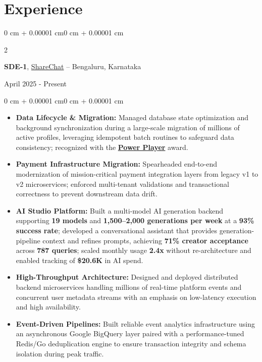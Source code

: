\documentclass[11pt, letterpaper]{extarticle}
\newenvironment{highlights}{
    \begin{itemize}[
        topsep=0.01 cm,
        parsep=0pt,
        partopsep=0pt,
        itemsep=0pt,
        leftmargin=0 cm + 10pt
    ]
}{
    \end{itemize}
}
\newenvironment{onecolentry}{
    \begin{adjustwidth}{0 cm + 0.00001 cm}{0 cm + 0.00001 cm}
}{
    \end{adjustwidth}
}
\newenvironment{twocolentry}[2][]{
    \onecolentry
    \def\secondColumn{#2}
    \setcolumnwidth{\fill, 4.5 cm}
    \begin{paracol}{2}
}{
    \switchcolumn \raggedleft \secondColumn
    \end{paracol}
    \endonecolentry
}
\begin{document}
    \section{Experience}
    \begin{twocolentry}{April 2025 - Present} 
    \textbf{SDE-1}, \href{https://www.linkedin.com/company/sharechat/}{ShareChat} -- Bengaluru, Karnataka
    \end{twocolentry}
    \vspace{0.05 cm}
    \begin{onecolentry}
        \begin{highlights}
            \item \textbf{Data Lifecycle \& Migration:} Managed database state optimization and background synchronization during a large-scale migration of millions of active profiles, leveraging idempotent batch routines to safeguard data consistency; recognized with the \textbf{\href{https://drive.google.com/file/d/1FOHJumoUjJBDf5vh6j29Qsov4uCIu1Ro/view?usp=sharing}{Power Player}} award.
            \item \textbf{Payment Infrastructure Migration:} Spearheaded end-to-end modernization of mission-critical payment integration layers from legacy v1 to v2 microservices; enforced multi-tenant validations and transactional correctness to prevent downstream data drift.
            \item \textbf{AI Studio Platform:} Built a multi-model AI generation backend supporting \textbf{19 models} and \textbf{1,500--2,000 generations per week} at a \textbf{93\% success rate}; developed a conversational assistant that provides generation-pipeline context and refines prompts, achieving \textbf{71\% creator acceptance} across \textbf{787 queries}; scaled monthly usage \textbf{2.4x} without re-architecture and enabled tracking of \textbf{\$20.6K} in AI spend.
            \item \textbf{High-Throughput Architecture:} Designed and deployed distributed backend microservices handling millions of real-time platform events and concurrent user metadata streams with an emphasis on low-latency execution and high availability.
            \item \textbf{Event-Driven Pipelines:} Built reliable event analytics infrastructure using an asynchronous Google BigQuery layer paired with a performance-tuned Redis/Go deduplication engine to ensure transaction integrity and schema isolation during peak traffic.

\end{highlights}
\end{onecolentry}
\end{document}
